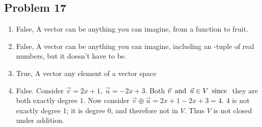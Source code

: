 \subsection*{Problem 17}
\begin{enumerate}
   
  \item[] False, A vector can be anything you can imagine, from a function to fruit.
     
  \item[] False, A vector can be anything you can imagine, including an -tuple of real numbers, but it doesn't have to be.
     
  \item[] True, A vector  any element of a vector space
     
  \item[] False. Consider $\vec{v} = 2x + 1,~\vec{u} = -2x +3$. Both $\vec{v} \operatorname{~\text{and}~} \vec{u} \in V \operatorname{~\text{since}~}$ they are both exactly degree 1.
    Now consider $\vec{v} \oplus \vec{u} = 2x +1 -2x +3 = 4$. $4$ is not exactly degree 1; it is degree 0, and therefore not in $V$.
    Thus $V$ is not closed under addition.
\end{enumerate}


